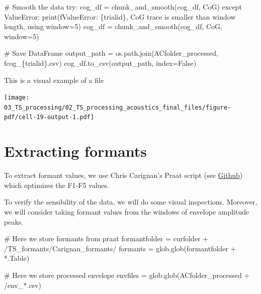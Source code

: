 \documentclass[
  letterpaper,
  DIV=11,
  numbers=noendperiod]{scrreprt}
\newenvironment{Shaded}{\begin{snugshade}}{\end{snugshade}}
\newcommand{\BuiltInTok}[1]{\textcolor[rgb]{0.00,0.23,0.31}{#1}}
\newcommand{\CommentTok}[1]{\textcolor[rgb]{0.37,0.37,0.37}{#1}}
\newcommand{\ControlFlowTok}[1]{\textcolor[rgb]{0.00,0.23,0.31}{#1}}
\newcommand{\DecValTok}[1]{\textcolor[rgb]{0.68,0.00,0.00}{#1}}
\newcommand{\NormalTok}[1]{\textcolor[rgb]{0.00,0.23,0.31}{#1}}
\newcommand{\OperatorTok}[1]{\textcolor[rgb]{0.37,0.37,0.37}{#1}}
\newcommand{\PreprocessorTok}[1]{\textcolor[rgb]{0.68,0.00,0.00}{#1}}
\newcommand{\SpecialCharTok}[1]{\textcolor[rgb]{0.37,0.37,0.37}{#1}}
\newcommand{\SpecialStringTok}[1]{\textcolor[rgb]{0.13,0.47,0.30}{#1}}
\newcommand{\StringTok}[1]{\textcolor[rgb]{0.13,0.47,0.30}{#1}}
\newcommand{\VariableTok}[1]{\textcolor[rgb]{0.07,0.07,0.07}{#1}}
\begin{document}
\begin{Shaded}
\begin{Highlighting}[]
    \CommentTok{\# Smooth the data}
    \ControlFlowTok{try}\NormalTok{:}
\NormalTok{        cog\_df }\OperatorTok{=}\NormalTok{ chunk\_and\_smooth(cog\_df, }\StringTok{\textquotesingle{}CoG\textquotesingle{}}\NormalTok{)}
    \ControlFlowTok{except} \PreprocessorTok{ValueError}\NormalTok{:}
        \BuiltInTok{print}\NormalTok{(}\SpecialStringTok{f\textquotesingle{}ValueError: }\SpecialCharTok{\{}\NormalTok{trialid}\SpecialCharTok{\}}\SpecialStringTok{, CoG trace is smaller than window length, using window=5\textquotesingle{}}\NormalTok{)}
\NormalTok{        cog\_df }\OperatorTok{=}\NormalTok{ chunk\_and\_smooth(cog\_df, }\StringTok{\textquotesingle{}CoG\textquotesingle{}}\NormalTok{, window}\OperatorTok{=}\DecValTok{5}\NormalTok{)}

    \CommentTok{\# Save DataFrame}
\NormalTok{    output\_path }\OperatorTok{=}\NormalTok{ os.path.join(ACfolder\_processed, }\SpecialStringTok{f\textquotesingle{}cog\_}\SpecialCharTok{\{}\NormalTok{trialid}\SpecialCharTok{\}}\SpecialStringTok{.csv\textquotesingle{}}\NormalTok{)}
\NormalTok{    cog\_df.to\_csv(output\_path, index}\OperatorTok{=}\VariableTok{False}\NormalTok{)}
\end{Highlighting}
\end{Shaded}

This is a visual example of a file

\texttt{[image: 03\_TS\_processing/02\_TS\_processing\_acoustics\_final\_files/figure-pdf/cell-19-output-1.pdf]}


\chapter{Extracting formants}\label{extracting-formants}

To extract formant values, we use Chris Carignan's Praat script (see
\href{https://github.com/ChristopherCarignan/formant-optimization}{Github})
which optimizes the F1-F5 values.

To verify the sensibility of the data, we will do some visual
inspections. Moreover, we will consider taking formant values from the
windows of envelope amplitude peaks.

\begin{Shaded}
\begin{Highlighting}[]
\CommentTok{\# Here we store formants from praat}
\NormalTok{formantfolder }\OperatorTok{=}\NormalTok{ curfolder }\OperatorTok{+} \StringTok{\textquotesingle{}/TS\_formants/Carignan\_formants/\textquotesingle{}}
\NormalTok{formants }\OperatorTok{=}\NormalTok{ glob.glob(formantfolder }\OperatorTok{+} \StringTok{\textquotesingle{}*.Table\textquotesingle{}}\NormalTok{)}

\CommentTok{\# Here we store processed envelope }
\NormalTok{envfiles }\OperatorTok{=}\NormalTok{ glob.glob(ACfolder\_processed }\OperatorTok{+} \StringTok{\textquotesingle{}/env\_*.csv\textquotesingle{}}\NormalTok{)}
\end{Highlighting}
\end{Shaded}
\end{document}
